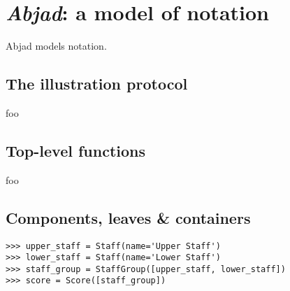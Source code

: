 \chapter{\emph{Abjad}: a model of notation}
\label{chap:a-model-of-notation}

\begin{comment}
<abjad>[hide=true]
import collections
import consort
</abjad>
\end{comment}

Abjad models notation.

\section{The illustration protocol}

foo

\section{Top-level functions}

foo

\section{Components, leaves \& containers}

\begin{comment}
<abjad>
upper_staff = Staff(name='Upper Staff')
lower_staff = Staff(name='Lower Staff')
staff_group = StaffGroup([upper_staff, lower_staff])
score = Score([staff_group])
</abjad>
\end{comment}

\begin{singlespacing}
\vspace{-0.5\baselineskip}
\begin{lstlisting}
>>> upper_staff = Staff(name='Upper Staff')
>>> lower_staff = Staff(name='Lower Staff')
>>> staff_group = StaffGroup([upper_staff, lower_staff])
>>> score = Score([staff_group])
\end{lstlisting}
\end{singlespacing}

